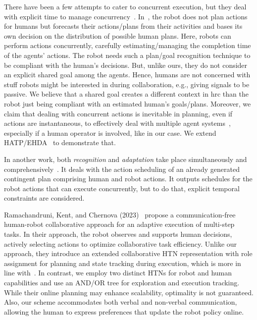 There have been a few attempts to cater to concurrent execution, but they deal with explicit time to manage concurrency~\cite{CirilloKS09a,kockemann2014grandpa}. 
In~\cite{CirilloKS09}, the robot does not plan actions for humans but forecasts their actions/plans from their activities and bases its own decision on the distribution of possible human plans. Here, robots can perform actions concurrently, carefully estimating/managing the completion time of the agents' actions. 
The robot needs such a plan/goal recognition technique to be compliant with the human's decisions. 
But, unlike ours, they do not consider an explicit shared goal among the agents. Hence, humans are not concerned with stuff robots might be interested in during collaboration, e.g., giving signals to be passive. 
We believe that a shared goal creates a different context in \acrshort{hrc} than the robot just being compliant with an estimated human's goals/plans. 
Moreover, we claim that dealing with concurrent actions is inevitable in planning, even if actions are instantaneous, to effectively deal with multiple agent systems~\cite{CrosbyJR14,ShekharB20}, especially if a human operator is involved, like in our case. 
We extend HATP/EHDA~\cite{buisan_hatpehda_icra} to demonstrate that.

In another work, both \textit{recognition} and \textit{adaptation} take place simultaneously and comprehensively~\cite{levine2014concurrent}. 
It deals with the action scheduling of an already generated contingent plan comprising human and robot actions. 
It outputs schedules for the robot actions that can execute concurrently, but to do that, explicit temporal constraints are considered. 

Ramachandruni, Kent, and Chernova (2023)~\cite{RAMACHANDRUNI2023} propose a communication-free human-robot collaborative approach for an adaptive execution of multi-step tasks. 
In their approach, the robot observes and supports human decisions, actively selecting actions to optimize collaborative task efficiency. 
Unlike our approach, they introduce an extended collaborative HTN representation with role assignment for planning and state tracking during execution, which is more in line with~\cite{roncone2017transparent}. 
In contrast, we employ two distinct HTNs for robot and human capabilities and use an AND/OR tree for exploration and execution tracking. While their online planning may enhance scalability, optimality is not guaranteed. 
Also, our scheme accommodates both verbal and non-verbal communication, allowing the human to express preferences that update the robot policy online. 

